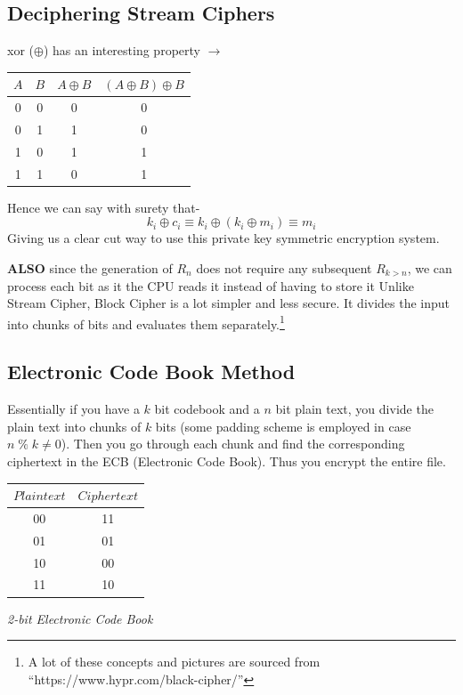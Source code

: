 		\subsection{Deciphering Stream Ciphers}
			xor ($\oplus$) has an interesting property \(\rightarrow\)
			\begin{center}
			\begin{tabular}{ c | c | c | c}
				 $A$ & $B$ & $A \oplus B$ & $(A \oplus B) \oplus B$\\ 
				 \hline
				 0 & 0 & 0 & 0\\  
				 0 & 1 & 1 & 0\\
				 1 & 0 & 1 & 1\\
				 1 & 1 & 0 & 1   
			\end{tabular}
			\end{center}
			Hence we can say with surety that-
			\[k_i \oplus c_i \equiv k_i \oplus (k_i \oplus m_i) \equiv m_i\]
			Giving us a clear cut way to use this private key symmetric encryption system.\par
			\textbf{ALSO} since the generation of \(R_n\) does not require any subsequent \(R_{k>n}\), we can process each bit as it the CPU reads it instead of having to store it
		Unlike Stream Cipher, Block Cipher is a lot simpler and less secure. It divides the input into chunks of bits and evaluates them separately.\footnote{A lot of these concepts and pictures are sourced from ``https://www.hypr.com/black-cipher/''} 

		\subsection{Electronic Code Book Method}
			Essentially if you have a \(k\) bit codebook and a \(n\) bit plain text, you divide the plain text into chunks of \(k\) bits (some padding scheme is employed in case \(n\;\% \;k \not = 0\)). Then you go through each chunk and find the corresponding ciphertext in the ECB (Electronic Code Book). Thus you encrypt the entire file.
			\begin{center}
			\begin{tabular}{ c | c }
				 $Plaintext$ & $Ciphertext$ \\ 
				 \hline
				 00 & 11\\   
				 01 & 01\\
				 10 & 00\\
				 11 & 10    
			\end{tabular}
			\end{center}
			\centering\emph{{2-bit Electronic Code Book}}


